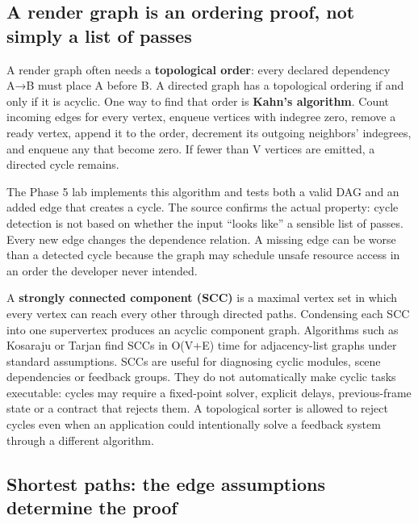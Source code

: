 \subsection{A render graph is an ordering proof, not simply a list of passes}\label{05-engine-i-ch008-a-render-graph-is-an-ordering-proof-not-simply-a-list-of-passes}

\hypertarget{05-engine-i-ch008-a-render-graph-is-an-ordering-proof-not-simply-a-list-of-passes}{}

A render graph often needs a \textbf{topological order}: every declared dependency A→B must place A before B. A directed graph has a topological ordering if and only if it is acyclic. One way to find that order is \textbf{Kahn's algorithm}. Count incoming edges for every vertex, enqueue vertices with indegree zero, remove a ready vertex, append it to the order, decrement its outgoing neighbors' indegrees, and enqueue any that become zero. If fewer than V vertices are emitted, a directed cycle remains.

The Phase 5 lab implements this algorithm and tests both a valid DAG and an added edge that creates a cycle. The source confirms the actual property: cycle detection is not based on whether the input ``looks like'' a sensible list of passes. Every new edge changes the dependence relation. A missing edge can be worse than a detected cycle because the graph may schedule unsafe resource access in an order the developer never intended.

A \textbf{strongly connected component (SCC)} is a maximal vertex set in which every vertex can reach every other through directed paths. Condensing each SCC into one supervertex produces an acyclic component graph. Algorithms such as Kosaraju or Tarjan find SCCs in O(V+E) time for adjacency-list graphs under standard assumptions. SCCs are useful for diagnosing cyclic modules, scene dependencies or feedback groups. They do not automatically make cyclic tasks executable: cycles may require a fixed-point solver, explicit delays, previous-frame state or a contract that rejects them. A topological sorter is allowed to reject cycles even when an application could intentionally solve a feedback system through a different algorithm.

\subsection{Shortest paths: the edge assumptions determine the proof}\label{05-engine-i-ch008-shortest-paths-the-edge-assumptions-determine-the-proof}

